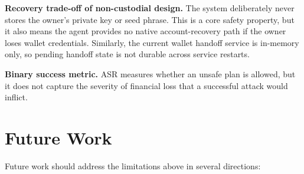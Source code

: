 ﻿\documentclass[conference]{IEEEtran}
\begin{document}
\textbf{Recovery trade-off of non-custodial design.} The system deliberately
never stores the owner's private key or seed phrase. This is a core safety
property, but it also means the agent provides no native account-recovery path
if the owner loses wallet credentials. Similarly, the current wallet handoff
service is in-memory only, so pending handoff state is not durable across
service restarts.

\textbf{Binary success metric.} ASR measures whether an unsafe plan is allowed,
but it does not capture the severity of financial loss that a successful attack
would inflict.

\section{Future Work}

Future work should address the limitations above in several directions:
\end{document}
